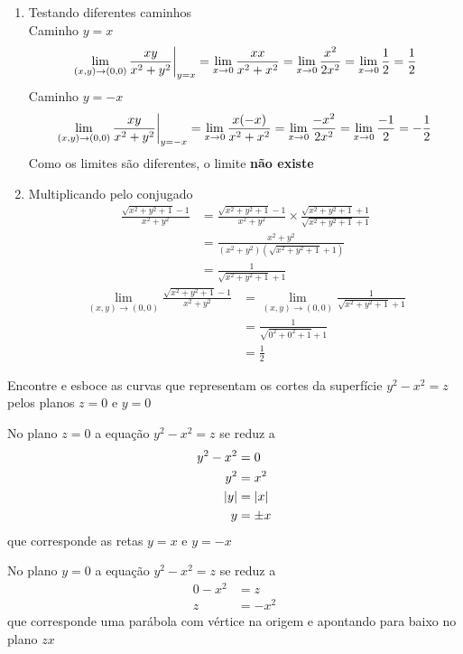 \documentclass[a4paper,12pt,fleqn]{article}
\begin{document}
\begin{answer}
\begin{enumerate}[label=(\alph*)]
  \item Testando diferentes caminhos \\
  Caminho \(y = x\)
  \[
    \lim_{(x,y) \to (0,0)} \frac{xy}{x^2 + y^2} \bigg\rvert_{y=x}^{}
    = \lim_{x \to 0} \frac{x x}{x^2 + x^2}
    = \lim_{x \to 0} \frac{x^2}{2x^2}
    = \lim_{x \to 0} \frac{1}{2}
    = \frac{1}{2}
  \]
  Caminho \(y = -x\)
  \[
    \lim_{(x,y) \to (0,0)} \frac{xy}{x^2 + y^2} \bigg\rvert_{y=-x}^{}
    = \lim_{x \to 0} \frac{x(-x)}{x^2 + x^2}
    = \lim_{x \to 0} \frac{-x^2}{2x^2}
    = \lim_{x \to 0} \frac{-1}{2}
    = -\frac{1}{2}
  \]
  Como os limites são diferentes, o limite \textbf{não existe}

\item Multiplicando pelo conjugado
  \begin{align*}
    \frac{\sqrt{x^2 + y^2 + 1} - 1}{x^2 + y^2}
    & = \frac{\sqrt{x^2 + y^2 + 1} - 1}{x^2 + y^2}
        \times
        \frac{\sqrt{x^2 + y^2 + 1} + 1}{\sqrt{x^2 + y^2 + 1} + 1} \\
    & = \frac{x^2 + y^2}{(x^2 + y^2)(\sqrt{x^2 + y^2 + 1} + 1)} \\
    & = \frac{1}{\sqrt{x^2 + y^2 + 1} + 1}
  \end{align*}
  \begin{align*}
    \lim_{(x,y) \to (0,0)} \frac{\sqrt{x^2 + y^2 + 1} - 1}{x^2 + y^2}
    & = \lim_{(x,y) \to (0,0)} \frac{1}{\sqrt{x^2 + y^2 + 1} + 1}  \\
    & = \frac{1}{\sqrt{0^2 + 0^2 + 1} + 1}   \\
    & = \frac{1}{2}
  \end{align*}
\end{enumerate}
\end{answer}

Encontre e esboce as curvas que representam os cortes da superfície
\(y^2-x^2=z\)
pelos planos
\(z=0\) e
\(y=0\)

\begin{answer}
  No plano \(z=0\) a equação \(y^2-x^2=z\) se reduz a
  \begin{align*}
    y^2-x^2 & = 0       \\
    y^2     & = x^2     \\
    \abs{y} & = \abs{x} \\
    y       & = \pm x
  \end{align*}
  que corresponde as retas \(y=x\) e \(y=-x\)

  No plano \(y=0\) a equação \(y^2-x^2=z\) se reduz a
  \begin{align*}
    0-x^2 & = z    \\
    z     & = -x^2
  \end{align*}
  que corresponde uma parábola com vértice na origem e apontando para baixo
  no plano $zx$
\end{answer}

\end{document}
